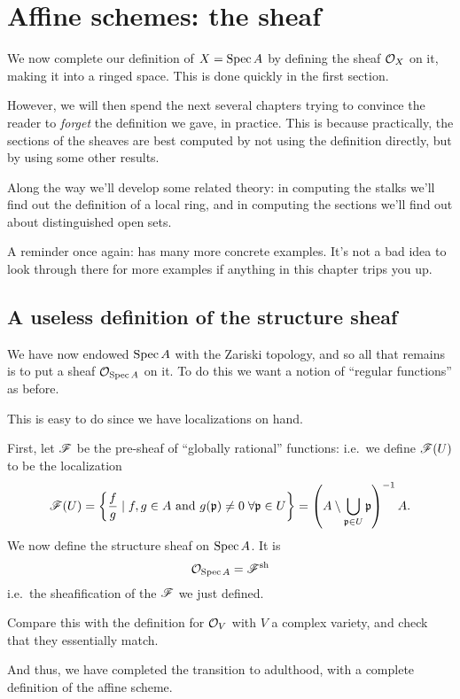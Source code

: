 \chapter{Affine schemes: the sheaf}
\label{ch:spec_sheaf}

We now complete our definition of $X = \operatorname{Spec} A$ by
defining the sheaf $\mathcal O_X$ on it, making it into a ringed space.
This is done quickly in the first section.

However, we will then spend the next several chapters
trying to convince the reader to \emph{forget}
the definition we gave, in practice.
This is because practically,
the sections of the sheaves are best computed by not using
the definition directly, but by using some other results.

Along the way we'll develop some related theory:
in computing the stalks we'll find out the definition of a local ring,
and in computing the sections we'll find out about distinguished open sets.

A reminder once again:  has
many more concrete examples.
It's not a bad idea to look through there for more examples
if anything in this chapter trips you up.

\section{A useless definition of the structure sheaf}

We have now endowed $\operatorname{Spec} A$ with the Zariski topology,
and so all that remains is to put a sheaf $\mathcal O_{\operatorname{Spec} A}$ on it.
To do this we want a notion of ``regular functions'' as before.

This is easy to do since we have localizations on hand.
\begin{definition}
	First, let $\mathscr F$ be the pre-sheaf of ``globally rational'' functions:
	i.e.\ we define $\mathscr F(U)$ to be the localization
	\[
		\mathscr F(U) = \left\{
			\frac fg \mid f, g \in A
			\text{ and } g(\mathfrak p) \neq 0 \; \forall \mathfrak p \in U
		\right\}
		= \left(A \setminus \bigcup_{\mathfrak p \in U} \mathfrak p \right)^{-1} A.
	\]
	We now define the structure sheaf on $\operatorname{Spec} A$.
	It is
	\[ \mathcal O_{\operatorname{Spec} A} = \mathscr F^\mathrm{sh} \]
	i.e.\ the sheafification of the $\mathscr F$ we just defined.
\end{definition}
\begin{exercise}
	Compare this with the definition for $\mathcal O_V$
	with $V$ a complex variety, and check that they essentially match.
\end{exercise}
And thus, we have completed the transition to adulthood,
with a complete definition of the affine scheme.

